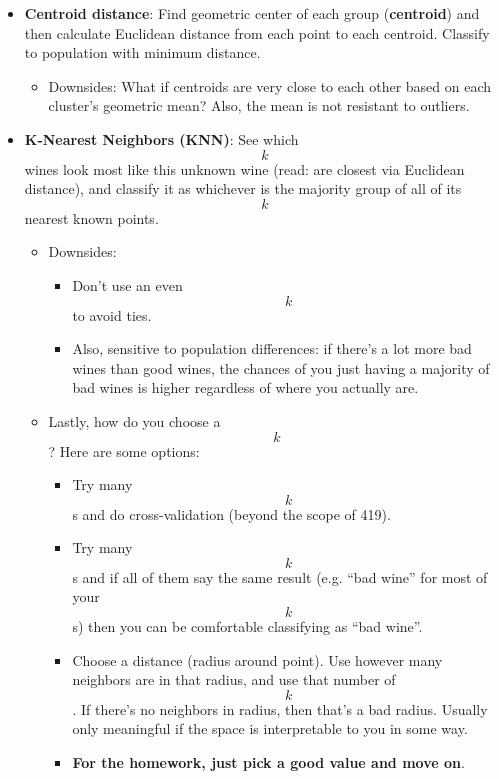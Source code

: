 \documentclass[]{article}
\providecommand{\tightlist}{%
  \setlength{\itemsep}{0pt}\setlength{\parskip}{0pt}}
\begin{document}
\begin{itemize}
\tightlist
\item
  \textbf{Centroid distance}: Find geometric center of each group
  (\textbf{centroid}) and then calculate Euclidean distance from each
  point to each centroid. Classify to population with minimum distance.

  \begin{itemize}
  \tightlist
  \item
    Downsides: What if centroids are very close to each other based on
    each cluster's geometric mean? Also, the mean is not resistant to
    outliers.
  \end{itemize}
\item
  \textbf{K-Nearest Neighbors (KNN)}: See which \[k\] wines look most
  like this unknown wine (read: are closest via Euclidean distance), and
  classify it as whichever is the majority group of all of its \[k\]
  nearest known points.

  \begin{itemize}
  \tightlist
  \item
    Downsides:

    \begin{itemize}
    \tightlist
    \item
      Don't use an even \[k\] to avoid ties.
    \item
      Also, sensitive to population differences: if there's a lot more
      bad wines than good wines, the chances of you just having a
      majority of bad wines is higher regardless of where you actually
      are.
    \end{itemize}
  \item
    Lastly, how do you choose a \[k\]? Here are some options:

    \begin{itemize}
    \tightlist
    \item
      Try many \[k\]s and do cross-validation (beyond the scope of 419).
    \item
      Try many \[k\]s and if all of them say the same result (e.g. ``bad
      wine'' for most of your \[k\]s) then you can be comfortable
      classifying as ``bad wine''.
    \item
      Choose a distance (radius around point). Use however many
      neighbors are in that radius, and use that number of \[k\]. If
      there's no neighbors in radius, then that's a bad radius. Usually
      only meaningful if the space is interpretable to you in some way.
    \item
      \textbf{For the homework, just pick a good value and move on}.
    \end{itemize}
  \end{itemize}
\end{itemize}
\end{document}
